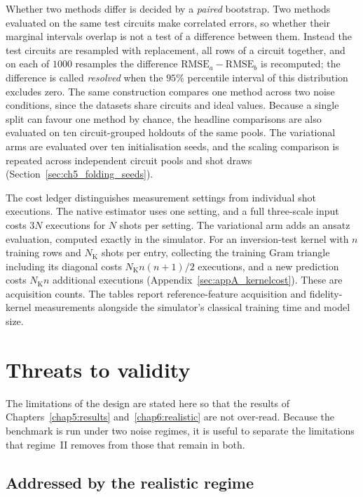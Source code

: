 \documentclass[Thesis.tex]{subfiles}
\begin{document}
Whether two methods differ is decided by a \emph{paired} bootstrap. Two methods
evaluated on the same test circuits make correlated errors, so whether their marginal
intervals overlap is not a test of a difference between them. Instead the test
circuits are resampled with replacement, all rows of a circuit together, and on each
of $1000$ resamples the difference $\mathrm{RMSE}_a - \mathrm{RMSE}_b$ is recomputed;
the difference is called \emph{resolved} when the $95\%$ percentile interval of this
distribution excludes zero. The same construction compares one method across two
noise conditions, since the datasets share circuits and ideal values. Because a
single split can favour one method by chance, the headline comparisons are
also evaluated on ten circuit-grouped holdouts of the same pools. The
variational arms are evaluated over ten initialisation seeds, and the scaling
comparison is repeated across independent circuit pools and shot draws
(Section~\ref{sec:ch5_folding_seeds}).

The cost ledger distinguishes measurement settings from individual shot
executions. The native estimator uses one setting, and a full three-scale
input costs $3N$ executions for $N$ shots per setting. The variational arm adds
an ansatz evaluation, computed exactly in the simulator. For an inversion-test
kernel with $n$ training rows and $N_{\mathrm{K}}$ shots per entry, collecting the training
Gram triangle including its diagonal costs $N_{\mathrm{K}}n(n+1)/2$ executions, and a new
prediction costs $N_{\mathrm{K}}n$ additional executions
(Appendix~\ref{sec:appA_kernelcost}). These are acquisition counts. The
tables report reference-feature acquisition and fidelity-kernel measurements
alongside the simulator's classical training time and model size.

\section{Threats to validity}\label{sec:ch3_validity}

The limitations of the design are stated here so that the results of
Chapters~\ref{chap5:results} and~\ref{chap6:realistic} are not over-read. Because the benchmark is run under
two noise regimes, it is useful to separate the limitations that regime~II removes
from those that remain in both.

\subsection{Addressed by the realistic regime}
\end{document}
